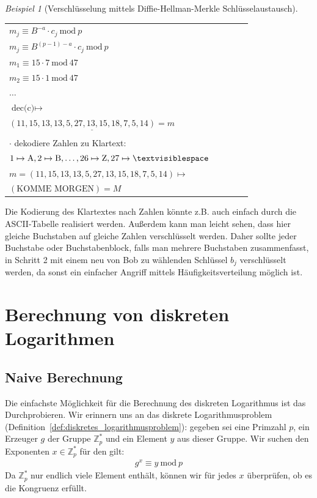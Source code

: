 \documentclass[
  a4paper,
  11pt,
]{scrartcl}
\theoremstyle{plain}
\theoremstyle{definition}
\theoremstyle{remark}
\newtheorem{beispiel}{Beispiel}
\newcommand{\Z}{\mathbb{Z}}
\newcommand{\Mod}[1]{\ \mathrm{mod}\ #1}
\begin{document}
\begin{beispiel}[Verschlüsselung mittels Diffie-Hellman-Merkle Schlüsselaustausch]
\begin{center}
\begin{tabularx}{\textwidth}{lXcXl}
      $m_j \equiv B^{-a} \cdot c_j \Mod{p}$ & & & & \\
      $m_j \equiv B^{(p-1)-a} \cdot c_j \Mod{p}$ & & & & \\
      $m_1 \equiv 15 \cdot 7 \Mod{47}$ & & & & \\
      $m_2 \equiv 15 \cdot 1 \Mod{47}$ & & & & \\
      $\dots$ & & & & \\
      $\text{dec(c)} \mapsto$ & & & & \\
      $\underline{(11, 15, 13, 13, 5, 27, 13, 15, 18, 7, 5, 14) = m}$ & & & & \\
      & & & & \\
      $\cdot$ dekodiere Zahlen zu Klartext: & & & & \\
      $1 \mapsto \text{A}, 2 \mapsto \text{B}, \ldots, 26 \mapsto \text{Z}, 27 \mapsto \textvisiblespace$ & & & & \\
      $m = (11, 15, 13, 13, 5, 27, 13, 15, 18, 7, 5, 14) \mapsto$ & & & & \\
      $(\text{KOMME MORGEN}) = M$ & & & & \\\midrule
    \end{tabularx}
  \end{center}
  Die Kodierung des Klartextes nach Zahlen könnte z.B. auch einfach durch die
  ASCII-Tabelle realisiert werden. Außerdem kann man leicht sehen, dass hier
  gleiche Buchstaben auf gleiche Zahlen verschlüsselt werden. Daher sollte
  jeder Buchstabe oder Buchstabenblock, falls man mehrere Buchstaben
  zusammenfasst, in Schritt 2 mit einem neu von Bob zu wählenden Schlüssel $b_j$
  verschlüsselt werden, da sonst ein einfacher Angriff mittels
  Häufigkeitsverteilung möglich ist.
\end{beispiel}


\section{Berechnung von diskreten Logarithmen}
\label{sec:berechnung_von_diskreten_logarithmen}

\subsection{Naive Berechnung}
\label{sub:naive_berechnung}

Die einfachste Möglichkeit für die Berechnung des diskreten Logarithmus ist das
Durchprobieren. Wir erinnern uns an das diskrete Logarithmusproblem
(Definition~\ref{def:diskretes_logarithmusproblem}): gegeben sei eine Primzahl
$p$, ein Erzeuger $g$ der Gruppe $\Z_p^*$ und ein Element $y$ aus dieser Gruppe.
Wir suchen den Exponenten $x \in \Z_p^*$ für den gilt:
\begin{align*}
  g^x \equiv y \Mod{p}
\end{align*}
Da $\Z_p^*$ nur endlich viele Element enthält, können wir für jedes $x$
überprüfen, ob es die Kongruenz erfüllt.
\end{document}
